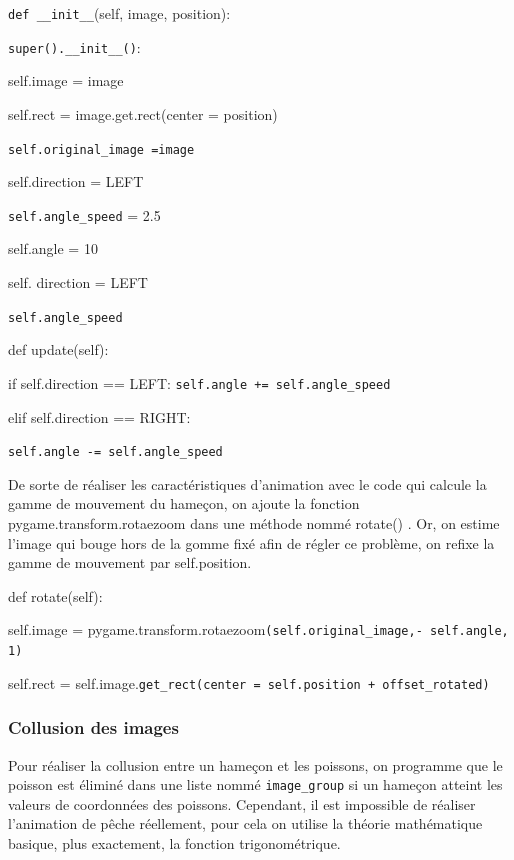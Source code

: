 \documentclass{article}
\begin{document}
\vspace{1cm}


\verb|def __init__|(self, image, position):


\verb|super().__init__()|:

self.image = image


self.rect = image.get.rect(center = position)


\verb|self.original_image =image|


self.direction = LEFT


\verb|self.angle_speed| = 2.5


self.angle = 10


self. direction = LEFT


\verb|self.angle_speed|\newline

def update(self):


if self.direction == LEFT:
\verb|self.angle += self.angle_speed|


elif self.direction == RIGHT:


\verb|self.angle -= self.angle_speed|

\vspace{1cm}
De sorte de réaliser les caractéristiques d’animation avec le code qui calcule la gamme de mouvement du hameçon, on ajoute la fonction pygame.transform.rotaezoom dans une méthode nommé rotate() . Or, on estime l’image qui bouge hors de la gomme fixé afin de régler ce problème, on refixe la gamme de mouvement par self.position.\newline

def rotate(self):

self.image = pygame.transform.rotaezoom\verb|(self.original_image,- self.angle, 1)|


self.rect = self.image.\verb|get_rect(center = self.position + offset_rotated)|
\subsubsection{Collusion des images}
Pour réaliser la collusion entre un hameçon et les poissons, on programme que le poisson est éliminé dans une liste nommé \verb|image_group| si un hameçon atteint les valeurs de coordonnées des poissons. Cependant, il est impossible de réaliser l’animation de pêche réellement, pour cela on utilise la théorie mathématique basique, plus exactement, la fonction trigonométrique.
\end{document}
